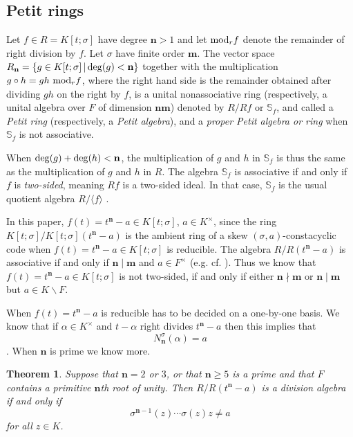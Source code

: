 \documentclass[11pt]{amsart}
\theoremstyle{plain}
\newtheorem{theorem}{Theorem}[section]
\theoremstyle{definition}
\numberwithin{equation}{section}
\numberwithin{figure}{section}
\newcommand{\extK}{K} %
\newcommand{\os}{{\mathbf{m}}}  %
\newcommand{\de}{{\mathbf{n}}}  %
\begin{document}
\subsection{Petit rings} \label{subsec:nonass}


Let $f \in R=K[t;\sigma]$ have degree $\de>1$ and let ${\rm mod}_r f$ denote the remainder of right division by $f$. Let $\sigma$ have finite order $\os$.
 The vector space $R_\de=\{g\in K[t;\sigma]\,|\, {\rm deg}(g)<\de\}$ together with the multiplication
 $g\circ h=gh \,\,{\rm mod}_r f $, where the right hand side is the remainder obtained after dividing $gh$ on the right by $f$,
 is a unital nonassociative ring (respectively, a unital algebra  over $F$ of dimension $\de \os$)
  denoted by $R/Rf$ or $\mathbb{S}_f$, and called a \emph{Petit ring} (respectively, a \emph{Petit algebra}), and a \emph{proper Petit algebra or ring} when $\mathbb{S}_f$ is not associative.

  When ${\rm deg}(g)+{\rm deg}(h)<\de$, the multiplication of $g$ and $h$ in $\mathbb{S}_f$ is thus the same as the multiplication of $g$ and $h$ in $R$. The algebra $\mathbb{S}_f$ is associative if and only if $f$ is \emph{two-sided}, meaning $Rf$ is a two-sided ideal.
In that case, $\mathbb{S}_f$ is the usual quotient algebra  $R/\langle f\rangle$ \cite[(7),(9), (10)]{Petit1967}.




 In this paper, $f(t)=t^\de-a\in K[t;\sigma]$, $a\in K^\times$, since the ring $K[t;\sigma]/K[t;\sigma](t^\de-a)$ is the ambient ring of a skew $(\sigma,a)$-constacyclic code when  $f(t)=t^\de-a\in K[t;\sigma]$ is reducible.
 The algebra $R/R(t^\de-a)$
 is  associative if and only if $\de\mid \os$  and $a\in F^\times$ (e.g. cf. \cite{Petit1967}).  Thus we know that  $f(t)=t^\de-a\in K[t;\sigma]$ is not two-sided, if and only if either $\de\nmid \os$ or  $\de\mid \os$ but $a\in \extK\smallsetminus F$.


When $f(t)=t^\de-a$ is reducible has to be decided on a one-by-one basis. We know that if $\alpha\in K^\times$ and $t-\alpha$ right divides $t^\de-a$ then this implies that
$$N_\de^\sigma(\alpha)=a$$
 \cite{Jacobson1996}.
When $\de$ is prime we know more.

\begin{theorem} \label{T:divalg} \cite[Theorem 3.11]{BrownPhD2018}
Suppose that $\de=2$ or $3$, or that $\de\geq 5$ is a prime and that $F$ contains a primitive $\de$th root of unity.
Then  $R/R(t^\de-a)$ is a division algebra if and only if
$$\sigma^{\de-1}(z)\cdots \sigma(z) z\not=a$$
for all $z\in K$.
\end{theorem}
\end{document}
